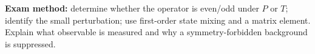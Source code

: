 \begin{methodbox}
\textbf{Exam method:} determine whether the operator is even/odd
under \(P\) or \(T\); identify the small perturbation;
use first-order state mixing and a matrix element.
Explain what observable is measured and why a symmetry-forbidden
background is suppressed.
\end{methodbox}
